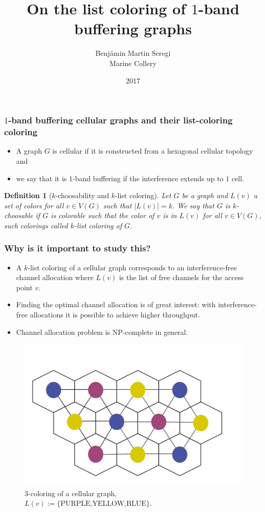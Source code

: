 \documentclass{beamer} %
\title{On the list coloring of $1$-band buffering graphs}
\author{Benjámin Martin Seregi\\Marine Collery}
\institute{
      \\[\medskipamount]
      KTH Royal Institute of Technology \\ II2202, Fall 2017, Period 1-2
}
\date{2017}
\newtheorem{defi}[lem]{Definition}
\begin{document}
\frame{\titlepage}

\begin{frame}
\frametitle{$1$-band buffering cellular graphs and their list-coloring coloring}
\justifying
\begin{itemize}
\item A graph $G$ is cellular if it is constructed from a hexagonal cellular topology and
\pause \item we say that it is $1$-band buffering if the interference extends up to $1$ cell.
\end{itemize}
\pause \begin{defi}[$k$-choosability and $k$-list coloring]
Let $G$ be a graph and $L(v)$ a set of colors for all $v \in V(G)$ such that $|L(v)|=k$. We say that $G$ is $k$\textit{-choosable} if $G$ is colorable such that the color of $v$ is in $L(v)$ for all $v \in V(G)$, such colorings called $k$\textit{-list coloring} of $G$.
\end{defi}
\end{frame}

\begin{frame}
\frametitle{Why is it important to study this?}
\justifying
\begin{itemize}
\item A $k$-list coloring of a cellular graph corresponds to an interference-free channel allocation where $L(v)$ is the list of free channels for the access point $v$.
\pause \item Finding the optimal channel allocation is of great interest: with interference-free allocations it is possible to achieve higher throughput.
\pause \item Channel allocation problem is $\mathrm{NP}$-complete in general.
\end{itemize}
\begin{figure}
\caption{3-coloring of a cellular graph, $L(v):=\lbrace \text{PURPLE,YELLOW,BLUE} \rbrace.$}
\includegraphics[scale=0.15]{3_coloring_cellular.png}
\end{figure}
\end{frame}
\end{document}
